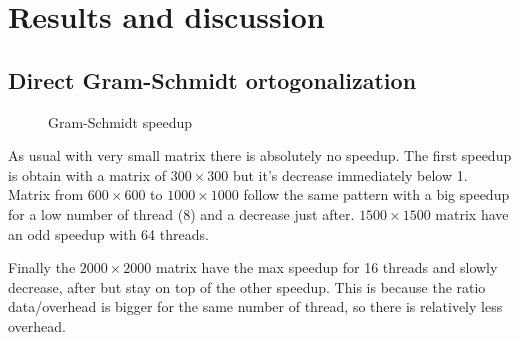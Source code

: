 \chapter{Results and discussion}

\section{Direct Gram-Schmidt ortogonalization}

\begin{figure}[ht]
  \begin{center}
  \end{center}
  \caption{Gram-Schmidt speedup}
  \label{fig:gram_speedup}
\end{figure} 

As usual with very small matrix there is absolutely no speedup. The first speedup is obtain with a matrix of $300\times 300$ but it's decrease immediately below 1. Matrix from $600\times 600$ to $1000\times 1000$ follow the same pattern with a big speedup for a low number of thread (8) and a decrease just after. $1500\times 1500$ matrix have an odd speedup with 64 threads.

Finally the $2000\times 2000$ matrix have the max speedup for 16 threads and slowly decrease, after but stay on top of the other speedup. This is because the ratio data/overhead is bigger for the same number of thread, so there is relatively less overhead.

